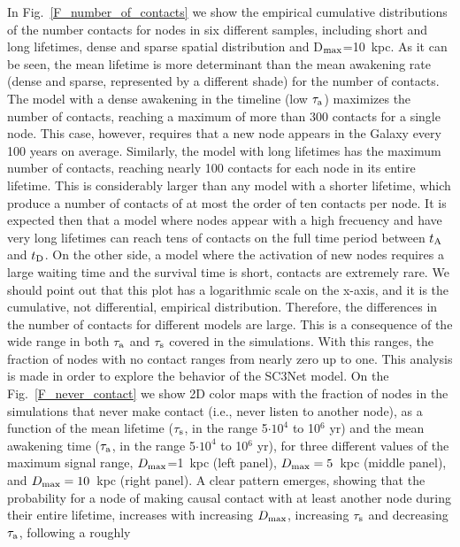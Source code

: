 \documentclass[crop]{CSLB}
\newcommand{\ceti}{node}
\newcommand{\cetis}{nodes}
\begin{document}
In Fig.~\ref{F_number_of_contacts} we show the empirical cumulative
distributions of the number contacts for \cetis{} in six different
samples, including short and long lifetimes, dense and sparse spatial
distribution and D$_{\rm max}$=10~kpc.
%
As it can be seen, the mean lifetime is more determinant than the mean
awakening rate (dense and sparse, represented by a different shade)
for the number of contacts.
%
The model with a dense awakening in the timeline (low $\tau_{\rm a}$)
maximizes the number of contacts, reaching a maximum of more than 300
contacts for a single \ceti{}.
%
This case, however, requires that a new node appears in the Galaxy
every 100 years on average.
%
Similarly, the model with long lifetimes has the maximum number of
contacts, reaching nearly 100 contacts for each \ceti{} in its entire
lifetime.
%
This is considerably larger than any model with a shorter lifetime,
which produce a number of contacts of at most the order of ten
contacts per \ceti{}.
%
It is expected then that a model where nodes appear with a high
frecuency and have very long lifetimes can reach tens of contacts on
the full time period between $t_{\rm A}$ and $t_{\rm D}$.
%
On the other side, a model where the activation of new nodes requires
a large waiting time and the survival time is short, contacts are
extremely rare.
%
We should point out that this plot has a logarithmic scale on the
x-axis, and it is the cumulative, not differential, empirical
distribution.
%
Therefore, the differences in the number of contacts for different
models are large.
%
This is a consequence of the wide range in both $\tau_{\rm a}$ and
$\tau_{\rm s}$ covered in the simulations.
%
With this ranges, the fraction of \cetis{} with no contact ranges from
nearly zero up to one.
%
This analysis is made in order to explore the behavior of the SC3Net
model.
%
On the Fig.~\ref{F_never_contact} we show 2D color maps with the
fraction of \cetis{} in the simulations that never make contact (i.e.,
never listen to another \ceti{}), as a function of the mean lifetime
($\tau_{\rm s}$, in the range 5$\cdot 10^4$ to 10$^6$ yr) and the mean
awakening time ($\tau_{\rm a}$, in the range 5$\cdot 10^4$ to 10$^6$
yr), for three different values of the maximum signal range, $D_{\rm
max}$=1~kpc (left panel), $D_{\rm max}=5$~kpc (middle panel), and
$D_{\rm max}=10$~kpc (right panel).
%
A clear pattern emerges, showing that the probability for a \ceti{} of
making causal contact with at least another \ceti{} during their
entire lifetime, increases with increasing $D_{\rm max}$, increasing
$\tau_{\rm s}$ and decreasing $\tau_{\rm a}$, following a roughly
\end{document}
